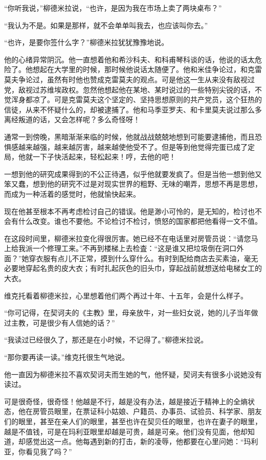 “你听我说，”柳德米拉说，“也许，是因为我在市场上卖了两块桌布？”

“我认为不是。如果是那样，就不会单单叫我去，也应该叫你去。”

“也许，是要你签什么字？”柳德米拉犹犹豫豫地说。

他的心绪异常阴沉。他一直想着他和希沙科夫、和科甫琴科谈的话，他说的话太危险了。他想起在大学里的时候，那时候他说话太随便了。他和米佳争论过，和克雷莫夫争论过，虽然有时他也赞成克雷莫夫的观点。可是他这一生从来没有敌视过党，敌视过苏维埃政权。忽然他想起他在某地、某时说过的一些特别尖锐的话，不觉浑身都凉了。可是克雷莫夫这个坚定的、坚持思想原则的共产党员，这个狂热的信徒，从来不怀疑什么的，却被逮捕了。他和马季亚罗夫、和卡里莫夫说过那么多离经叛道的话，又会怎样呢？多么奇怪呀！

通常一到傍晚，黑暗渐渐来临的时候，他就战战兢兢地想到可能要逮捕他，而且恐惧感越来越强，越来越厉害，越来越使他受不了。但是等到他觉得完蛋已成了定局，他就一下子快活起来，轻松起来！哼，去他的吧！

一想到他的研究成果得到的不公正待遇，似乎他就要发疯了。但是当他一想到他又笨又蠢，想到他的研究不过是对现实世界的粗野、无味的嘲弄，思想不再是思想，而成为一种活着的感觉时，他就愉快起来。

现在他甚至根本不再考虑检讨自己的错误。他是渺小可怜的，是无知的，检讨也不会有什么改变。谁也不要他。不论检讨不检讨，愤怒的国家都把他看得一文不值。

在这段时间里，柳德米拉变化得很厉害。她已经不在电话里对房管员说：“请您马上给我派一个修理工来。”不再到楼梯上去检査：“这是谁又把垃圾倒在洞口外面？”她穿衣服有点儿不正常，摸到什么穿什么。有时到配给商店去买素油，毫无必要地穿起名贵的皮大衣；有时扎起灰色的旧头巾，穿起战前就想送给电梯女工的大衣。

维克托看着柳德米拉，心里想着他们两个再过十年、十五年，会是什么样子。

“你可记得，在契诃夫的《主教》里，母亲放牛，对一些妇女说，她的儿子当年做过主教，可是很少有人信她的话？”

“我读过已经很久了，那还是在小时候，不记得了。”柳德米拉说。

“那你要再读一读。”维克托很生气地说。

他一直因为柳德米拉不喜欢契诃夫而生她的气，他怀疑，契诃夫有很多小说她没有读过。

可是很奇怪，很奇怪！他越是不行，越是没有办法，越是接近于精神上的全熵状态，他在房管员眼里，在票证科小姑娘、户籍员、办事员、试验员、科学家、朋友们的眼里，甚至在亲人们的眼里，甚至也许在契贝任的眼里，也许在妻子的眼里，越是不值钱，可是在玛利亚眼里却越是可贵，越是可亲。他们没有见面，他却知道，却感觉出这一点。他每遇到新的打击，新的凌辱，他都要在心里问她：“玛利亚，你看见我了吗？”

